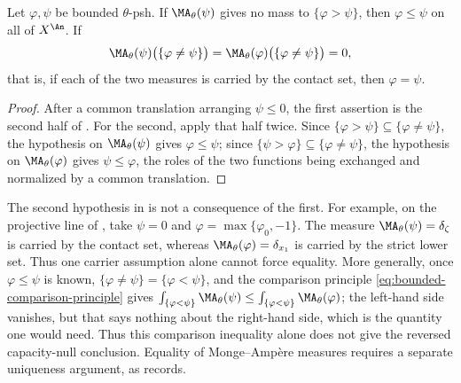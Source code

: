 \begin{corollary}
\label{cor:ch25-domination-uniqueness}
Let $\varphi,\psi$ be bounded $\theta$-psh.
If $\MA_\theta(\psi)$ gives no mass to $\{\varphi>\psi\}$, then
$\varphi\leq\psi$ on all of $X^{\An}$.  If
\[
 \MA_\theta(\psi)\bigl(\{\varphi\neq\psi\}\bigr)
 =\MA_\theta(\varphi)\bigl(\{\varphi\neq\psi\}\bigr)=0 ,
\]
that is, if each of the two measures is carried by the contact set, then
$\varphi=\psi$.
\end{corollary}

\begin{proof}
After a common translation arranging $\psi\leq0$, the first assertion
is the second half of .  For the second, apply that half
twice.  Since $\{\varphi>\psi\}\subseteq\{\varphi\neq\psi\}$, the
hypothesis on $\MA_\theta(\psi)$ gives $\varphi\leq\psi$; since
$\{\psi>\varphi\}\subseteq\{\varphi\neq\psi\}$, the hypothesis on
$\MA_\theta(\varphi)$ gives $\psi\leq\varphi$, the roles of the two
functions being exchanged and normalized by a common translation.
\end{proof}

\begin{remark}
\label{rem:ch25-both-carriers}
The second hypothesis in
 is not a consequence of the first.
For example, on the projective line of
, take $\psi=0$ and
$\varphi=\max\{\varphi_0,-1\}$.  The measure
$\MA_\theta(\psi)=\delta_\zeta$ is carried by the contact set, whereas
$\MA_\theta(\varphi)=\delta_{x_1}$ is carried by the strict lower set.
Thus one carrier assumption alone cannot force equality.  More generally, once $\varphi\leq\psi$ is known, $\{\varphi\neq\psi\}=\{\varphi<\psi\}$,
and the comparison principle \eqref{eq:bounded-comparison-principle} gives
$\int_{\{\varphi<\psi\}}\MA_\theta(\psi)\leq
\int_{\{\varphi<\psi\}}\MA_\theta(\varphi)$; the left-hand side vanishes,
but that says nothing about the right-hand side, which is the quantity one
would need.  Thus this comparison inequality alone does not give the reversed
capacity-null conclusion.  Equality of Monge--Amp\`ere measures requires
a separate uniqueness argument, as  records.
\end{remark}

